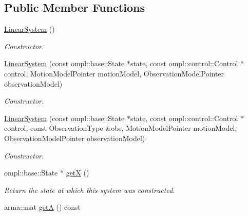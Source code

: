 \subsection*{\-Public \-Member \-Functions}
\begin{DoxyCompactItemize}
\item 
\hypertarget{class_linear_system_a3f75bddc5fb799e7daab008f415bd1fa}{\hyperlink{class_linear_system_a3f75bddc5fb799e7daab008f415bd1fa}{\-Linear\-System} ()}\label{class_linear_system_a3f75bddc5fb799e7daab008f415bd1fa}

\begin{DoxyCompactList}\small\item\em \-Constructor. \end{DoxyCompactList}\item 
\hypertarget{class_linear_system_a6f05277076a4302dbcfa9646232871dc}{\hyperlink{class_linear_system_a6f05277076a4302dbcfa9646232871dc}{\-Linear\-System} (const ompl\-::base\-::\-State $\ast$state, const ompl\-::control\-::\-Control $\ast$control, \-Motion\-Model\-Pointer motion\-Model, \-Observation\-Model\-Pointer observation\-Model)}\label{class_linear_system_a6f05277076a4302dbcfa9646232871dc}

\begin{DoxyCompactList}\small\item\em \-Constructor. \end{DoxyCompactList}\item 
\hypertarget{class_linear_system_a428c800b858ed6c6d63230c64e470208}{\hyperlink{class_linear_system_a428c800b858ed6c6d63230c64e470208}{\-Linear\-System} (const ompl\-::base\-::\-State $\ast$state, const ompl\-::control\-::\-Control $\ast$control, const \-Observation\-Type \&obs, \-Motion\-Model\-Pointer motion\-Model, \-Observation\-Model\-Pointer observation\-Model)}\label{class_linear_system_a428c800b858ed6c6d63230c64e470208}

\begin{DoxyCompactList}\small\item\em \-Constructor. \end{DoxyCompactList}\item 
\hypertarget{class_linear_system_a7d556441c0f68f6ccfdde32b72f888b6}{ompl\-::base\-::\-State $\ast$ \hyperlink{class_linear_system_a7d556441c0f68f6ccfdde32b72f888b6}{get\-X} ()}\label{class_linear_system_a7d556441c0f68f6ccfdde32b72f888b6}

\begin{DoxyCompactList}\small\item\em \-Return the state at which this system was constructed. \end{DoxyCompactList}\item 
\hypertarget{class_linear_system_aa9b7cdb3f9e09902fbe9b1d65d932edb}{arma\-::mat \hyperlink{class_linear_system_aa9b7cdb3f9e09902fbe9b1d65d932edb}{get\-A} () const }\label{class_linear_system_aa9b7cdb3f9e09902fbe9b1d65d932edb}


\end{DoxyCompactItemize}
